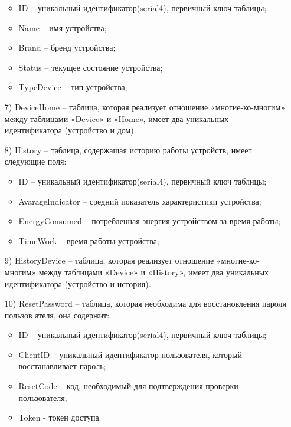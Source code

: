 \begin{enumerate}
    \begin{itemize}
        \item ID -- уникальный идентификатор(serial4), первичный ключ таблицы;
        \item Name -- имя устройства;
        \item Brand -- бренд устройства;
        \item Status -- текущее состояние устройства;
        \item TypeDevice -- тип устройства;
    \end{itemize}
    \item[7)] DeviceHome -- таблица, которая реализует отношение 
    «многие-ко-многим» между таблицами «Device» и «Home»,
    имеет два уникальных идентификатора (устройство и дом).
    \item[8)] History -- таблица, содержащая историю работы устройств, имеет следующие поля:
    \begin{itemize}
        \item ID -- уникальный идентификатор(serial4), первичный ключ таблицы;
        \item AvarageIndicator -- средний показатель характеристики устройства;
        \item EnergyConsumed -- потребленная энергия устройством за время работы;
        \item TimeWork -- время работы устройства;
    \end{itemize}
    \item[9)] HistoryDevice -- таблица, которая реализует отношение 
    «многие-ко-многим» между таблицами «Device» и «History»,
    имеет два уникальных идентификатора (устройство и история).
    \item[10)] ResetPassword -- таблица, которая необходима для восстановления пароля пользов ателя, она содержит:
    \begin{itemize}
        \item ID -- уникальный идентификатор(serial4), первичный ключ таблицы;
        \item ClientID -- уникальный идентификатор пользователя, который восстанавливает пароль;
        \item ResetCode -- код, необходимый для подтверждения проверки пользователя;
        \item Token - токен доступа.
    \end{itemize}
        
    
\end{enumerate}

